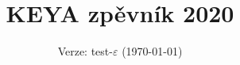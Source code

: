 \documentclass[twoside,12pt,a5paper]{article}
\title{KEYA zpěvník 2020}
\date{Verze: test-$\varepsilon$ (\today)}
\begin{document}
\maketitle
\tableofcontents{}
\clearpage

\end{document}
